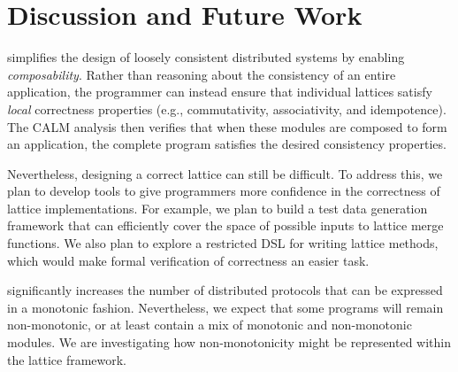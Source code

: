 \section{Discussion and Future Work}
\label{sec:discussion}

\lang simplifies the design of loosely consistent distributed systems by
enabling \emph{composability}. Rather than reasoning about the consistency of an
entire application, the programmer can instead ensure that individual lattices
satisfy \emph{local} correctness properties (e.g., commutativity, associativity,
and idempotence). The CALM analysis then verifies that when these modules are
composed to form an application, the complete program satisfies the desired
consistency properties.

Nevertheless, designing a correct lattice can still be difficult. To address
this, we plan to develop tools to give programmers more confidence in the
correctness of lattice implementations. For example, we plan to build a test
data generation framework that can efficiently cover the space of possible
inputs to lattice merge functions. We also plan to explore a restricted DSL for
writing lattice methods, which would make formal verification of correctness an
easier task.

\lang significantly increases the number of distributed protocols that can be
expressed in a monotonic fashion. Nevertheless, we expect that some programs
will remain non-monotonic, or at least contain a mix of monotonic and
non-monotonic modules. We are investigating how non-monotonicity might be
represented within the lattice framework.